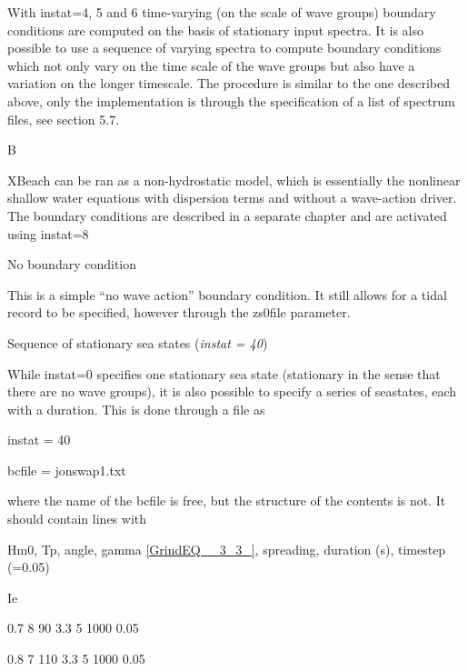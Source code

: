 With instat=4, 5 and 6 time-varying (on the scale of wave groups) boundary conditions are computed on the basis of stationary input spectra. It is also possible to use a sequence of varying spectra to compute boundary conditions which not only vary on the time scale of the wave groups but also have a variation on the longer timescale. The procedure is similar to the one described above, only the implementation is through the specification of a list of spectrum files, see section 5.7.

B\textit{}

\underbar{}

XBeach can be ran as a non-hydrostatic model, which is essentially the nonlinear shallow water  equations with dispersion terms and without a wave-action driver. The boundary conditions are described in a separate chapter and are activated using instat=8

No boundary condition \underbar{(}\textit{}

\underbar{}

This is a simple ``no wave action'' boundary condition. It still allows for a tidal record to be specified, however through the zs0file parameter.

Sequence of stationary sea states (\textit{instat = 40})\underbar{}

\underbar{}

While instat=0 specifies one stationary sea state (stationary in the sense that there are no wave groups), it is also possible to specify a series of seastates, each with a duration. This is done through a file as

instat   = 40

bcfile   = jonswap1.txt

where the name of the bcfile is free, but the structure of the contents is not. It should contain lines with

Hm0, Tp, angle, gamma \eqref{GrindEQ__3_3_}, spreading, duration (s), timestep (=0.05)

Ie

0.7 8 90 3.3 5 1000 0.05

0.8 7 110 3.3 5 1000 0.05



\textit{}

\underbar{}

